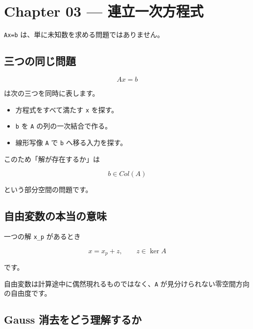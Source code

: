 \documentclass[
  11pt,
  a4paper,
]{ltjsarticle}
\author{}
\date{}
\providecommand{\tightlist}{%
  \setlength{\itemsep}{0pt}\setlength{\parskip}{0pt}}
\begin{document}
\hypertarget{chapter-03-ux9023ux7acbux4e00ux6b21ux65b9ux7a0bux5f0f}{%
\section{Chapter 03 ---
連立一次方程式}\label{chapter-03-ux9023ux7acbux4e00ux6b21ux65b9ux7a0bux5f0f}}

\texttt{Ax=b} は、単に未知数を求める問題ではありません。

\hypertarget{ux4e09ux3064ux306eux540cux3058ux554fux984c}{%
\subsection{三つの同じ問題}\label{ux4e09ux3064ux306eux540cux3058ux554fux984c}}

\[
Ax=b
\]

は次の三つを同時に表します。

\begin{itemize}
\tightlist
\item
  方程式をすべて満たす \texttt{x} を探す。
\item
  \texttt{b} を \texttt{A} の列の一次結合で作る。
\item
  線形写像 \texttt{A} で \texttt{b} へ移る入力を探す。
\end{itemize}

このため「解が存在するか」は

\[
b\in Col(A)
\]

という部分空間の問題です。

\hypertarget{ux81eaux7531ux5909ux6570ux306eux672cux5f53ux306eux610fux5473}{%
\subsection{自由変数の本当の意味}\label{ux81eaux7531ux5909ux6570ux306eux672cux5f53ux306eux610fux5473}}

一つの解 \texttt{x\_p} があるとき

\[
x=x_p+z,\qquad z\in\ker A
\]

です。

自由変数は計算途中に偶然現れるものではなく、\texttt{A}
が見分けられない零空間方向の自由度です。

\hypertarget{gauss-ux6d88ux53bbux3092ux3069ux3046ux7406ux89e3ux3059ux308bux304b}{%
\subsection{Gauss
消去をどう理解するか}\label{gauss-ux6d88ux53bbux3092ux3069ux3046ux7406ux89e3ux3059ux308bux304b}}
\end{document}
